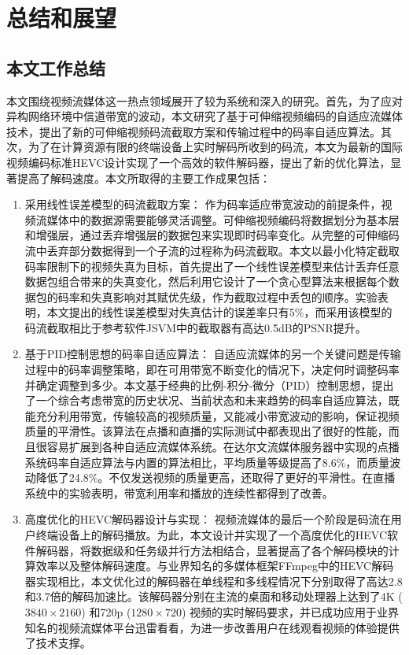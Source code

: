 \chapter{总结和展望}

\section{本文工作总结}

本文围绕视频流媒体这一热点领域展开了较为系统和深入的研究。首先，为了应对异构网络环境中信道带宽的波动，本文研究了基于可伸缩视频编码的自适应流媒体技术，提出了新的可伸缩视频码流截取方案和传输过程中的码率自适应算法。其次，为了在计算资源有限的终端设备上实时解码所收到的码流，本文为最新的国际视频编码标准HEVC设计实现了一个高效的软件解码器，提出了新的优化算法，显著提高了解码速度。本文所取得的主要工作成果包括：
\begin{enumerate}
\item {采用线性误差模型的码流截取方案：}
作为码率适应带宽波动的前提条件，视频流媒体中的数据源需要能够灵活调整。可伸缩视频编码将数据划分为基本层和增强层，通过丢弃增强层的数据包来实现即时码率变化。从完整的可伸缩码流中丢弃部分数据得到一个子流的过程称为码流截取。本文以最小化特定截取码率限制下的视频失真为目标，首先提出了一个线性误差模型来估计丢弃任意数据包组合带来的失真变化，然后利用它设计了一个贪心型算法来根据每个数据包的码率和失真影响对其赋优先级，作为截取过程中丢包的顺序。实验表明，本文提出的线性误差模型对失真估计的误差率只有5\%，而采用该模型的码流截取相比于参考软件JSVM中的截取器有高达0.5dB的PSNR提升。
\item {基于PID控制思想的码率自适应算法：}
自适应流媒体的另一个关键问题是传输过程中的码率调整策略，即在可用带宽不断变化的情况下，决定何时调整码率并确定调整到多少。本文基于经典的比例-积分-微分（PID）控制思想，提出了一个综合考虑带宽的历史状况、当前状态和未来趋势的码率自适应算法，既能充分利用带宽，传输较高的视频质量，又能减小带宽波动的影响，保证视频质量的平滑性。该算法在点播和直播的实际测试中都表现出了很好的性能，而且很容易扩展到各种自适应流媒体系统。在达尔文流媒体服务器中实现的点播系统码率自适应算法与内置的算法相比，平均质量等级提高了8.6\%，而质量波动降低了24.8\%。不仅发送视频的质量更高，还取得了更好的平滑性。在直播系统中的实验表明，带宽利用率和播放的连续性都得到了改善。
\item {高度优化的HEVC解码器设计与实现：}
视频流媒体的最后一个阶段是码流在用户终端设备上的解码播放。为此，本文设计并实现了一个高度优化的HEVC软件解码器，将数据级和任务级并行方法相结合，显著提高了各个解码模块的计算效率以及整体解码速度。与业界知名的多媒体框架FFmpeg中的HEVC解码器实现相比，本文优化过的解码器在单线程和多线程情况下分别取得了高达2.8和3.7倍的解码加速比。该解码器分别在主流的桌面和移动处理器上达到了4K ($3840 \times 2160$) 和720p ($1280 \times 720$) 视频的实时解码要求，并已成功应用于业界知名的视频流媒体平台迅雷看看，为进一步改善用户在线观看视频的体验提供了技术支撑。
\end{enumerate}

